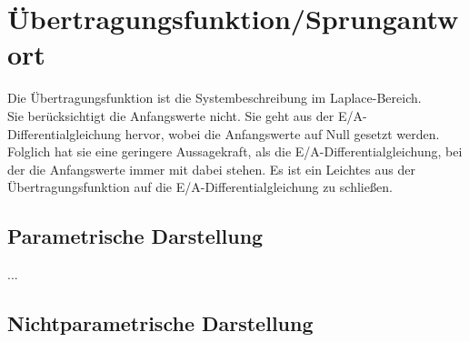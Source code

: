 \documentclass[
  ngerman
  ,12pt
  ,pdftex
]{article}
\begin{document}
\section{Übertragungsfunktion/Sprungantwort}
Die Übertragungsfunktion ist die Systembeschreibung im Laplace-Bereich.\\
Sie berücksichtigt die Anfangswerte nicht. Sie geht aus der E/A-Differential\-gleichung hervor, wobei die Anfangswerte auf Null gesetzt werden. Folglich hat sie eine geringere Aussagekraft, als die E/A-Differentialgleichung, bei der die Anfangswerte immer mit dabei stehen. Es ist ein Leichtes aus der Übertragungsfunktion auf die E/A-Differentialgleichung zu schließen.
\subsection{Parametrische Darstellung} %



...
\subsection{Nichtparametrische Darstellung}
\end{document}
